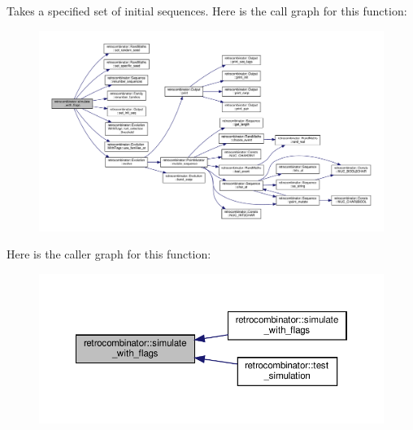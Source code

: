 Takes a specified set of initial sequences. Here is the call graph for this function\+:
\nopagebreak
\begin{figure}[H]
\begin{center}
\leavevmode
\includegraphics[width=350pt]{namespaceretrocombinator_a3d34bdb68843d370ccb2374dfb8e9eac_cgraph}
\end{center}
\end{figure}
Here is the caller graph for this function\+:
\nopagebreak
\begin{figure}[H]
\begin{center}
\leavevmode
\includegraphics[width=350pt]{namespaceretrocombinator_a3d34bdb68843d370ccb2374dfb8e9eac_icgraph}
\end{center}
\end{figure}
\mbox{\label{namespaceretrocombinator_a3875c27225976a6e04bde555c3acca36}} 
